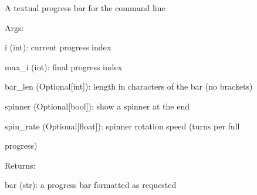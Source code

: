 \documentclass[letterpaper,10pt,english]{sphinxmanual}
\begin{document}

\begin{fulllineitems}
\label{doctree/soprano.utils:soprano.utils.progbar}
A textual progress bar for the command line

\begin{DUlineblock}{0em}
\item[] Args:
\item[]
\begin{DUlineblock}{\DUlineblockindent}
\item[] i (int): current progress index
\item[] max\_i (int): final progress index
\item[] bar\_len (Optional{[}int{]}): length in characters of the bar (no brackets)
\item[] spinner (Optional{[}bool{]}): show a spinner at the end
\item[] spin\_rate (Optional{[}float{]}): spinner rotation speed (turns per full
\item[]
\begin{DUlineblock}{\DUlineblockindent}
\item[] progress)
\end{DUlineblock}
\end{DUlineblock}
\end{DUlineblock}

\begin{DUlineblock}{0em}
\item[] Returns:
\item[]
\begin{DUlineblock}{\DUlineblockindent}
\item[] bar (str): a progress bar formatted as requested
\end{DUlineblock}
\end{DUlineblock}

\end{fulllineitems}

\end{document}
